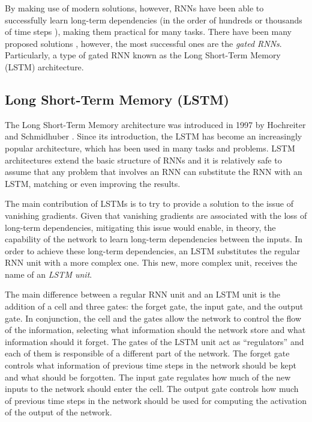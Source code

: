 By making use of modern solutions, however, RNNs have been able to successfully learn long-term dependencies (in the order of hundreds or thousands of time steps \cite{hochreiter1997long}), making them practical for many tasks. There have been many proposed solutions \cite{elhihi1995hierarchical, yildiz2012revisiting, jaeger2012long}, however, the most successful ones are the \emph{gated RNNs}. Particularly, a type of gated RNN known as the Long Short-Term Memory (LSTM) architecture.

\subsection{Long Short-Term Memory (LSTM)}

The Long Short-Term Memory architecture was introduced in 1997 by Hochreiter and Schmidhuber \cite{hochreiter1997long}. Since its introduction, the LSTM has become an increasingly popular architecture, which has been used in many tasks and problems. LSTM architectures extend the basic structure of RNNs and it is relatively safe to assume that any problem that involves an RNN can substitute the RNN with an LSTM, matching or even improving the results.

The main contribution of LSTMs is to try to provide a solution to the issue of vanishing gradients. Given that vanishing gradients are associated with the loss of long-term dependencies, mitigating this issue would enable, in theory, the capability of the network to learn long-term dependencies between the inputs. In order to achieve these long-term dependencies, an LSTM substitutes the regular RNN unit with a more complex one. This new, more complex unit, receives the name of an \emph{LSTM unit}.

The main difference between a regular RNN unit and an LSTM unit is the addition of a cell and three gates: the forget gate, the input gate, and the output gate. In conjunction, the cell and the gates allow the network to control the flow of the information, selecting what information should the network store and what information should it forget. 
The gates of the LSTM unit act as ``regulators'' and each of them is responsible of a different part of the network. The forget gate controls what information of previous time steps in the network should be kept and what should be forgotten. The input gate regulates how much of the new inputs to the network should enter the cell. The output gate controls how much of previous time steps in the network should be used for computing the activation of the output of the network.

